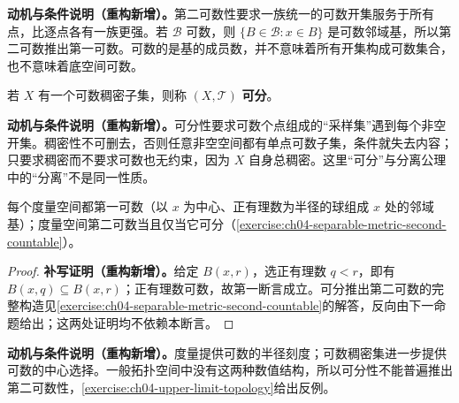 \documentclass[../../main.tex]{subfiles}%
\begin{document}
\begin{remark}
\textbf{动机与条件说明（重构新增）。}第二可数性要求一族统一的可数开集服务于所有点，比逐点各有一族更强。若 $\mathcal B$ 可数，则 $\{B\in\mathcal B:x\in B\}$ 是可数邻域基，所以第二可数推出第一可数。可数的是基的成员数，并不意味着所有开集构成可数集合，也不意味着底空间可数。
\end{remark}
\begin{definition}[可分空间]\label{definition:ch04-separable}
若 $X$ 有一个可数稠密子集，则称 $(X,\mathcal T)$ \textbf{可分}。
\end{definition}
\begin{remark}
\textbf{动机与条件说明（重构新增）。}可分性要求可数个点组成的“采样集”遇到每个非空开集。稠密性不可删去，否则任意非空空间都有单点可数子集，条件就失去内容；只要求稠密而不要求可数也无约束，因为 $X$ 自身总稠密。这里“可分”与分离公理中的“分离”不是同一性质。
\end{remark}
\begin{proposition}\label{proposition:ch04-metric-countability}
每个度量空间都第一可数（以 $x$ 为中心、正有理数为半径的球组成 $x$ 处的邻域基）；度量空间第二可数当且仅当它可分（\cref{exercise:ch04-separable-metric-second-countable}）。
\end{proposition}
\begin{proof}
\textbf{补写证明（重构新增）。}给定 $B(x,r)$，选正有理数 $q<r$，即有 $B(x,q)\subseteq B(x,r)$；正有理数可数，故第一断言成立。可分推出第二可数的完整构造见\cref{exercise:ch04-separable-metric-second-countable}的解答，反向由下一命题给出；这两处证明均不依赖本断言。
\end{proof}
\begin{remark}
\textbf{动机与条件说明（重构新增）。}度量提供可数的半径刻度；可数稠密集进一步提供可数的中心选择。一般拓扑空间中没有这两种数值结构，所以可分性不能普遍推出第二可数性，\cref{exercise:ch04-upper-limit-topology}给出反例。
\end{remark}
\end{document}
